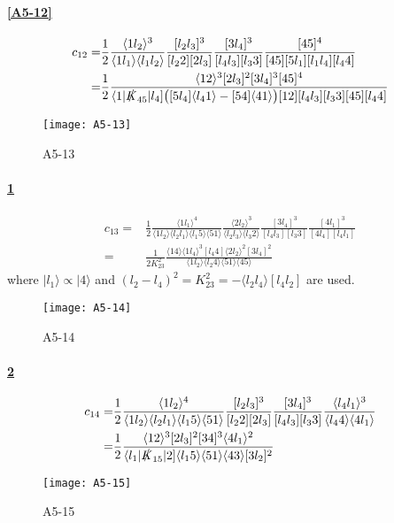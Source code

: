 \paragraph{\ref{A5-12}}
\begin{equation*}
\begin{split}
c_{12} = &
\frac{1}{2}
\frac{\langle 1 l_2 \rangle^3}{\langle 1 l_1\rangle\langle l_1 l_2\rangle}
\frac{[l_2 l_3]^3}{[l_2 2 ][2l_3]}
\frac{[3l_4]^3}{[l_4 l_3][l_3 3]}
\frac{[45]^4}{[45][5l_1][l_1 l_4][l_4 4]}
\\
= &
\frac{1}{2}\frac{\langle 12 \rangle^3[2l_3]^2[3l_4]^3[45]^4}{\langle 1|\slashed{K}_{45}|l_4] \big([5l_4]\langle l_41\rangle - [54]\langle 41 \rangle\big) [12][l_4 l_3][l_3 3 ][45][l_4 4]}
\end{split}
\end{equation*}
%
%
\begin{figure}
  \centering
    \texttt{[image: A5-13]}
    \caption{A5-13}
  \label{A5-13}
\end{figure}
\paragraph{\ref{A5-13}}
\begin{equation*}
\begin{split}
c_{13} = &
\frac{1}{2}\frac{\langle 1 l_1 \rangle^4}{\langle 1 l_2 \rangle\langle l_2 l_1 \rangle\langle l_1 5 \rangle\langle 51 \rangle}
\frac{\langle 2l_2\rangle^3}{\langle l_2 l_3\rangle\langle l_3 2 \rangle}
\frac{[3l_4]^3}{[l_4 l_3][l_3 3]}
\frac{[4l_1]^3}{[4l_4][l_4l_1]}
\\
= &
\frac{1}{2K_{23}^2}\frac{\langle 14\rangle\langle 1 l_4\rangle^3[l_4 4]\langle 2l_2\rangle^2[3l_4]^2}{\langle 1l_2\rangle\langle l_2 4\rangle\langle 51\rangle\langle 45\rangle}
\end{split}
\end{equation*}
where $|l_1\rangle \propto |4\rangle$ and $(l_2 - l_4)^2 = K_{23}^2 = -\langle l_2 l_4\rangle[l_4l_2]$ are used.
%
%
\begin{figure}
  \centering
    \texttt{[image: A5-14]}
    \caption{A5-14}
  \label{A5-14}
\end{figure}
\paragraph{\ref{A5-14}}
\begin{equation*}
\begin{split}
c_{14} = & \frac{1}{2}\frac{\langle 1l_2\rangle^4}{\langle 1 l_2 \rangle\langle l_2 l_1 \rangle\langle l_1 5\rangle\langle 5 1\rangle}
\frac{[l_2 l_3]^3}{[l_2 2 ][2 l_3]}
\frac{[3l_4]^3}{[l_4 l_3][l_3 3]}
\frac{\langle l_4 l_1 \rangle^3}{\langle l_4 4 \rangle\langle 4 l_1\rangle}
\\
= &
\frac{1}{2}
\frac{\langle 12 \rangle^3[2l_3]^2[34]^3\langle 4 l_1 \rangle^2}{\langle l_1 |\slashed{K}_{15}|2]\langle l_1 5\rangle\langle 51 \rangle\langle 43\rangle[3l_2]^2}
\end{split}
\end{equation*}
%
%
\begin{figure}
  \centering
    \texttt{[image: A5-15]}
    \caption{A5-15}
  \label{A5-15}
\end{figure}
